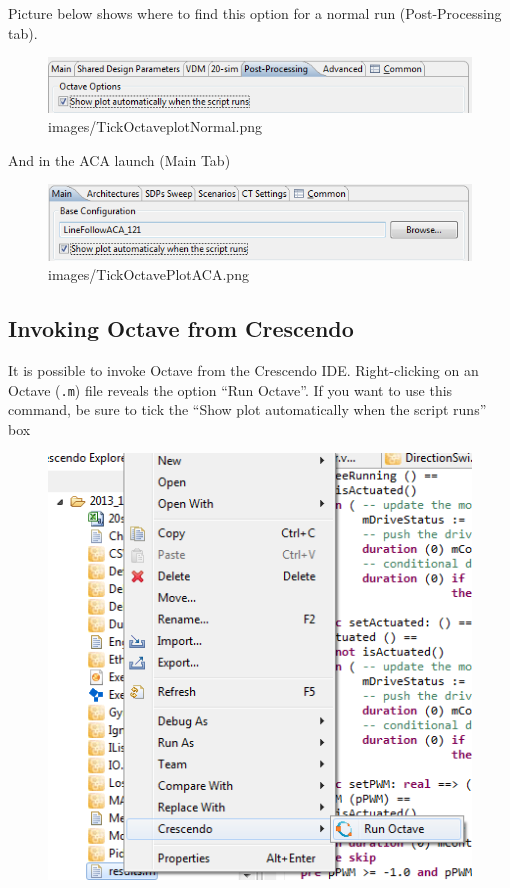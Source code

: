 \documentclass{crescendorepchap}
\begin{document}
Picture below shows where to find this option for a normal run
(Post-Processing tab).

\begin{figure}[htbp]
\centering
\includegraphics[width=.6\textwidth]{images/TickOctaveplotNormal.png}
\caption{images/TickOctaveplotNormal.png}
\end{figure}

And in the ACA launch (Main Tab)

\begin{figure}[htbp]
\centering
\includegraphics[width=.6\textwidth]{images/TickOctavePlotACA.png}
\caption{images/TickOctavePlotACA.png}
\end{figure}

\subsection{Invoking Octave from Crescendo}

It is possible to invoke Octave from the Crescendo IDE. Right-clicking on
an Octave (\texttt{.m}) file reveals the option ``Run Octave''. If you want to
use this command, be sure to tick the ``Show plot automatically when the
script runs'' box

\begin{figure}[htbp]
\centering
\includegraphics[width=.6\textwidth]{images/OctaveAction.png}
\caption{}
\end{figure}
\end{document}
